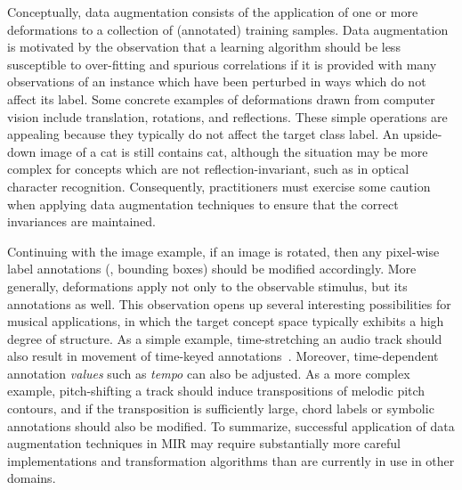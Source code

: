 \documentclass{article}
\begin{document}
Conceptually, data augmentation consists of the application of one or more deformations to
a collection of (annotated) training samples.  
Data augmentation is motivated by the observation that a learning algorithm should be less
susceptible to over-fitting and spurious correlations if it is provided with many
observations of an instance which have been perturbed in ways which do not affect its
label.
Some concrete examples of deformations drawn from computer vision include translation, 
rotations, and reflections.  These simple operations are appealing because they typically 
do not affect the target class label. An upside-down image of a cat is still contains cat, 
although the situation may be more complex for concepts which are not reflection-invariant, 
such as in optical character recognition.  Consequently, practitioners must exercise some 
caution when applying data augmentation techniques to ensure that the correct invariances 
are maintained.

Continuing with the image example, if an image is rotated, then any pixel-wise 
label annotations (\eg, bounding boxes) should be modified accordingly.  
More generally, deformations apply not only to the observable stimulus, 
but its annotations as well.
This observation opens up several interesting possibilities for musical applications, in
which the target concept space typically exhibits a high degree of structure.
As a simple example, time-stretching an audio track should also result in movement of 
time-keyed annotations~\cite{mauch2013audio}.  
Moreover, time-dependent annotation \emph{values} such as \emph{tempo} can also be adjusted.
As a more complex example,
pitch-shifting a track should induce transpositions of melodic pitch contours,
and if the transposition is sufficiently large, chord labels or symbolic annotations
should also be modified.
To summarize, successful application of data augmentation techniques in MIR may require
substantially more careful implementations and transformation algorithms than are currently 
in use in other domains.

\end{document}
